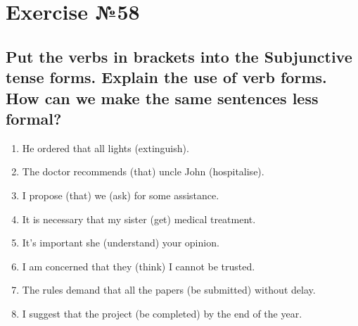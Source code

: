 \section{Exercise №58}
\subsection*{Put the verbs in brackets into the Subjunctive tense forms. Explain the use of verb
      forms. How can we make the same sentences less formal?}
\begin{enumerate}
      \item He ordered that all lights (extinguish).
      \item The doctor recommends (that) uncle John (hospitalise).
      \item I propose (that) we (ask) for some assistance.
      \item It is necessary that my sister (get) medical treatment.
      \item It's important she (understand) your opinion.
      \item I am concerned that they (think) I cannot be trusted.
      \item The rules demand that all the papers (be submitted) without delay.
      \item I suggest that the project (be completed) by the end of the year.
\end{enumerate}

